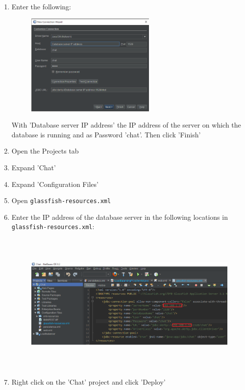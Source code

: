 \documentclass[11pt]{article}
\begin{document}
\begin{enumerate}
\begin{figure}[H]
	\end{figure}
	\item Enter the following:
	\begin{figure}[H]
		\centering
		\includegraphics[height=50mm]{new_db_connection.png}
	\end{figure}
	With 'Database server IP address' the IP address of the server on which the database is running and as Password 'chat'. Then click 'Finish'
	

	
	\item Open the Projects tab
	\item Expand 'Chat'
	\item Expand 'Configuration Files'
	\item Open \texttt{glassfish-resources.xml}
	\item Enter the IP address of the database server in the following locations in \texttt{glassfish-resources.xml}:
	\begin{figure}[H]
		\centering
		\includegraphics[height=70mm]{enter_db_ip_gf_resources.png}
	\end{figure}
	\item Right click on the 'Chat' project and click 'Deploy'
\end{enumerate}
\end{document}
